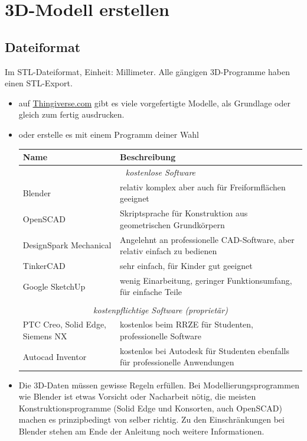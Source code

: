 \documentclass{\basedir/fablab-document}
\begin{document}

\renewcommand{\contentsname}{Inhaltsverzeichnis / Arbeitsablauf}
\setcounter{tocdepth}{2}
\tableofcontents
\newpage

\section{3D-Modell erstellen}
\subsection{Dateiformat}

Im STL-Dateiformat, Einheit: Millimeter. Alle gängigen 3D-Programme haben einen STL-Export.

\begin{itemize}
\item auf \href{https://thingiverse.com}{Thingiverse.com} gibt es viele vorgefertigte Modelle, als
Grundlage oder gleich zum fertig ausdrucken.
\item oder erstelle es mit einem Programm deiner Wahl
\begin{table}[H]
\centering
\begin{tabularx}{\textwidth}{|l|X|}
\hline \textbf{Name} & \textbf{Beschreibung} \\
\hline \multicolumn{2}{|c|}{\textit{kostenlose Software}}  \\
\hline Blender & relativ komplex aber auch für Freiformflächen geeignet  \\
\hline OpenSCAD & Skriptsprache für Konstruktion aus geometrischen Grundkörpern \\
\hline DesignSpark Mechanical & Angelehnt an professionelle CAD-Software, aber relativ einfach zu bedienen  \\
\hline TinkerCAD & sehr einfach, für Kinder gut geeignet  \\
\hline Google SketchUp & wenig Einarbeitung, geringer Funktionsumfang, für einfache Teile \\
\hline & \\
\hline \multicolumn{2}{|c|}{\textit{kostenpflichtige Software (proprietär)}}  \\
\hline PTC Creo, Solid Edge, Siemens NX & kostenlos beim RRZE für Studenten, professionelle Software \\
\hline Autocad Inventor & kostenlos bei Autodesk für Studenten ebenfalls für professionelle Anwendungen \\
\hline
\end{tabularx}
\end{table}
\item Die 3D-Daten müssen gewisse Regeln erfüllen. Bei Modellierungsprogrammen wie Blender ist etwas Vorsicht oder Nacharbeit nötig, die meisten Konstruktionsprogramme (Solid Edge und Konsorten, auch OpenSCAD) machen es prinzipbedingt von selber richtig. Zu den Einschränkungen bei Blender stehen am Ende der Anleitung noch weitere Informationen.
\end{itemize}
\end{document}
